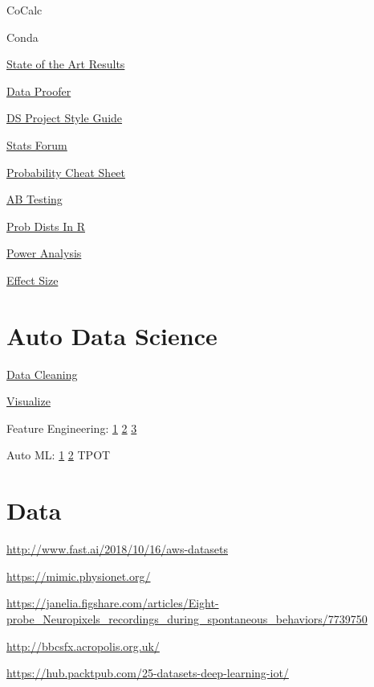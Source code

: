 \documentclass[]{book}
\begin{document}
CoCalc

Conda

\href{https://paperswithcode.com/sota}{State of the Art Results}

\href{http://dataproofer.org/}{Data Proofer}

\href{https://www.dataquest.io/blog/data-science-project-style-guide/}{DS
Project Style Guide}

\href{https://discourse.datamethods.org/}{Stats Forum}

\href{http://www.wzchen.com/probability-cheatsheet}{Probability Cheat
Sheet}

\href{http://www.evanmiller.org/announcing-evans-awesome-ab-tools.html}{AB
Testing}

\href{http://www.cyclismo.org/tutorial/R/probability.html}{Prob Dists In
R}

\href{https://www.statmethods.net/stats/power.html}{Power Analysis}

\href{https://www.leeds.ac.uk/educol/documents/00002182.htm}{Effect
Size}

\section{Auto Data Science}\label{auto-data-science}

\href{http://www.dataland.ai/index.php}{Data Cleaning}

\href{http://holoviews.org}{Visualize}

Feature Engineering: \href{https://www.featuretools.com}{1} \textbar{}
\href{https://towardsdatascience.com/automated-feature-engineering-in-python-99baf11cc219}{2}
\textbar{} \href{https://www.featurelabs.com/}{3}

Auto ML: \href{https://cloud.google.com/automl/}{1} \textbar{}
\href{http://www.ml4aad.org}{2} \textbar{} TPOT

\section{Data}\label{data}

\url{http://www.fast.ai/2018/10/16/aws-datasets}

\url{https://mimic.physionet.org/}

\url{https://janelia.figshare.com/articles/Eight-probe_Neuropixels_recordings_during_spontaneous_behaviors/7739750}

\url{http://bbcsfx.acropolis.org.uk/}

\url{https://hub.packtpub.com/25-datasets-deep-learning-iot/}
\end{document}
